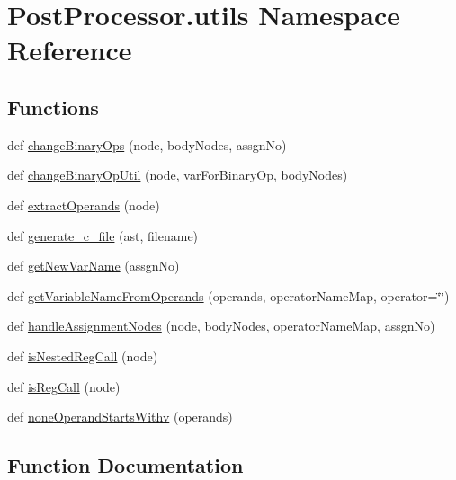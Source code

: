 \hypertarget{namespacePostProcessor_1_1utils}{}\section{Post\+Processor.\+utils Namespace Reference}
\label{namespacePostProcessor_1_1utils}
\subsection*{Functions}
\begin{DoxyCompactItemize}
\item 
def \hyperlink{namespacePostProcessor_1_1utils_a1ea8f909bf93721481e4fd1bd3f2dff1}{change\+Binary\+Ops} (node, body\+Nodes, assgn\+No)
\item 
def \hyperlink{namespacePostProcessor_1_1utils_ab12ae71cedd8ec3fcbfedd7a6dbe6599}{change\+Binary\+Op\+Util} (node, var\+For\+Binary\+Op, body\+Nodes)
\item 
def \hyperlink{namespacePostProcessor_1_1utils_a756305ef1f9ed9b8a0f01428433e026e}{extract\+Operands} (node)
\item 
def \hyperlink{namespacePostProcessor_1_1utils_a998fb471074ff747973a0d974eb9fbd1}{generate\+\_\+c\+\_\+file} (ast, filename)
\item 
def \hyperlink{namespacePostProcessor_1_1utils_a69c4094b747eccefbd43b8011b1c3626}{get\+New\+Var\+Name} (assgn\+No)
\item 
def \hyperlink{namespacePostProcessor_1_1utils_a9d9413cee00e1440bd03c215f3ebbaff}{get\+Variable\+Name\+From\+Operands} (operands, operator\+Name\+Map, operator=\char`\"{}\char`\"{})
\item 
def \hyperlink{namespacePostProcessor_1_1utils_a8b77a1f205d7dac14e6bdcccdb61e5f6}{handle\+Assignment\+Nodes} (node, body\+Nodes, operator\+Name\+Map, assgn\+No)
\item 
def \hyperlink{namespacePostProcessor_1_1utils_a86292ec94138d20acb13a3c9c136a468}{is\+Nested\+Reg\+Call} (node)
\item 
def \hyperlink{namespacePostProcessor_1_1utils_a89d6f2461251261de6b862c69fe3c44a}{is\+Reg\+Call} (node)
\item 
def \hyperlink{namespacePostProcessor_1_1utils_a379c264b5800e073d327d90d53cb854f}{none\+Operand\+Starts\+Withv} (operands)
\end{DoxyCompactItemize}


\subsection{Function Documentation}
\mbox{\label{namespacePostProcessor_1_1utils_a1ea8f909bf93721481e4fd1bd3f2dff1}} 
